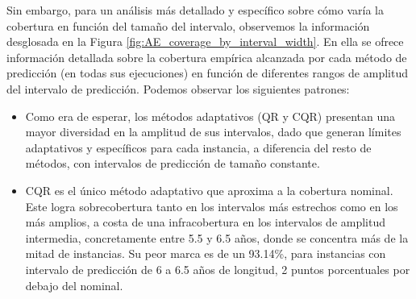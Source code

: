 \FloatBarrier

Sin embargo, para un análisis más detallado y específico sobre cómo varía la cobertura en función del tamaño del intervalo, observemos la información desglosada en la Figura \ref{fig:AE_coverage_by_interval_width}.
En ella se ofrece información detallada sobre la cobertura empírica alcanzada por cada método de predicción (en todas sus ejecuciones) en función de diferentes rangos de amplitud del intervalo de predicción. Podemos observar los siguientes patrones:

\begin{itemize}
    
    \item Como era de esperar, los métodos adaptativos (QR y CQR) presentan una mayor diversidad en la amplitud de sus intervalos, dado que generan límites adaptativos y específicos para cada instancia, a diferencia del resto de métodos, con intervalos de predicción de tamaño constante.
    
    \item CQR es el único método adaptativo que aproxima a la cobertura nominal. Este logra sobrecobertura tanto en los intervalos más estrechos como en los más amplios, a costa de una infracobertura en los intervalos de amplitud intermedia, concretamente entre 5.5 y 6.5 años, donde se concentra más de la mitad de instancias. Su peor marca es de un 93.14\%, para instancias con intervalo de predicción de 6 a 6.5 años de longitud, 2 puntos porcentuales por debajo del nominal. 

\end{itemize}

